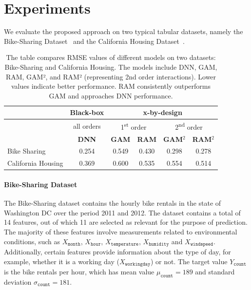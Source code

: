 \documentclass[12pt]{article}
\begin{document}
\section{Experiments}

We evaluate the proposed approach on two typical tabular datasets, namely the Bike-Sharing Dataset~\citep{misc_bike_sharing_dataset_275}
and the California Housing Dataset~\citep{pace1997sparse}.


\begin{table}[htbp]
  \centering
  \caption{The table compares RMSE values of different models on two datasets: Bike-Sharing and California Housing.
  The models include DNN, GAM, RAM, GAM², and RAM² (representing 2nd order interactions).
  Lower values indicate better performance.
  RAM consistently outperforms GAM and approaches DNN performance.}
  \label{tab:sample}
  \begin{tabular}{l|c|cccc}
      \hline
      & \textbf{Black-box} & \multicolumn{4}{c}{\textbf{x-by-design}} \\
      \hline
      \hline
      & all orders & \multicolumn{2}{c}{1\textsuperscript{st} order} & \multicolumn{2}{c}{2\textsuperscript{nd} order} \\
      \hline
      \hline
      & \textbf{DNN} & \textbf{GAM} & \textbf{RAM} & \textbf{GAM}$^2$ & \textbf{RAM}$^2$ \\
      \hline
      Bike Sharing      & 0.254 & 0.549 & 0.430 & 0.298 & 0.278 \\
      \hline
      California Housing      & 0.369 & 0.600 & 0.535 & 0.554 & 0.514 \\
  \end{tabular}
\end{table}

\paragraph{Bike-Sharing Dataset}

The Bike-Sharing dataset contains the hourly bike rentals in the state of Washington DC over the period 2011 and 2012.
The dataset contains a total of 14 features, out of which 11 are selected as relevant for the purpose of prediction.
The majority of these features involve measurements related to environmental conditions,
such as $X_{\mathtt{month}}$, $X_{\mathtt{hour}}$, $X_{\mathtt{temperature}}$, $X_{\mathtt{humidity}}$ and $X_{\mathtt{windspeed}}$.
Additionally, certain features provide information about the type of day, for example, whether it is a working day ($X_{\mathtt{workingday}}$) or not.
The target value \( Y_{\mathtt{count}}\) is the bike rentals per hour, which has mean value
\(\mu_{\mathtt{count}} = 189\) and standard deviation \(\sigma_{\mathtt{count}} = 181\).
\end{document}
